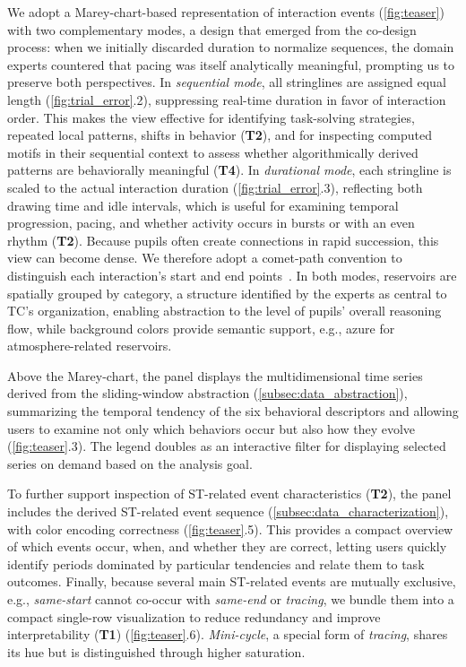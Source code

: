 \documentclass[letterpaper,journal]{IEEEtran}
\begin{document}
We adopt a Marey-chart-based representation of interaction events (\cref{fig:teaser}) with two complementary modes, a design that emerged from the co-design process: when we initially discarded duration to normalize sequences, the domain experts countered that pacing was itself analytically meaningful, prompting us to preserve both perspectives.
In \textit{sequential mode}, all stringlines are assigned equal length (\cref{fig:trial_error}.2), suppressing real-time duration in favor of interaction order.
This makes the view effective for identifying task-solving strategies, repeated local patterns, shifts in behavior (\textbf{T2}), and for inspecting computed motifs in their sequential context to assess whether algorithmically derived patterns are behaviorally meaningful (\textbf{T4}).
In \textit{durational mode}, each stringline is scaled to the actual interaction duration (\cref{fig:trial_error}.3), reflecting both drawing time and idle intervals, which is useful for examining temporal progression, pacing, and whether activity occurs in bursts or with an even rhythm (\textbf{T2}).
Because pupils often create connections in rapid succession, this view can become dense. We therefore adopt a comet-path convention to distinguish each interaction's start and end points~\cite{holten2011extended, armstrong2014visualizing}.
In both modes, reservoirs are spatially grouped by category, a structure identified by the experts as central to TC's organization, enabling abstraction to the level of pupils' overall reasoning flow, while background colors provide semantic support, e.g., azure for atmosphere-related reservoirs.

Above the Marey-chart, the panel displays the multidimensional time series derived from the sliding-window abstraction (\cref{subsec:data_abstraction}), summarizing the temporal tendency of the six behavioral descriptors and allowing users to examine not only which behaviors occur but also how they evolve (\cref{fig:teaser}.3). 
The legend doubles as an interactive filter for displaying selected series on demand based on the analysis goal.

To further support inspection of ST-related event characteristics (\textbf{T2}), the panel includes the derived ST-related event sequence (\cref{subsec:data_characterization}), with color encoding correctness (\cref{fig:teaser}.5). 
This provides a compact overview of which events occur, when, and whether they are correct, letting users quickly identify periods dominated by particular tendencies and relate them to task outcomes.
Finally, because several main ST-related events are mutually exclusive, e.g., \textit{same-start} cannot co-occur with \textit{same-end} or \textit{tracing}, we bundle them into a compact single-row visualization to reduce redundancy and improve interpretability (\textbf{T1}) (\cref{fig:teaser}.6). 
\textit{Mini-cycle}, a special form of \textit{tracing}, shares its hue but is distinguished through higher saturation.
\end{document}
